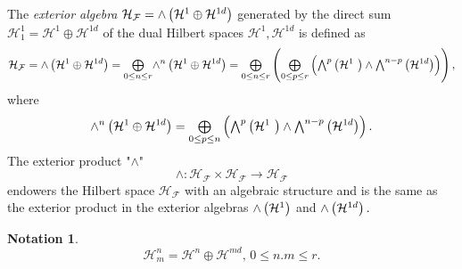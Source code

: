 \documentclass[aps,preprint]{revtex4}%
\newtheorem{notation}[theorem]{Notation}
\begin{document}
The \emph{exterior algebra} $\mathcal{H}_{\mathcal{F}}={\huge \wedge}\left(
\mathcal{H}^{1}\oplus\mathcal{H}^{1d}\right)  $ generated by the direct sum
$\mathcal{H}_{1}^{1}=\mathcal{H}^{1}\oplus\mathcal{H}^{1d}$ of the dual
Hilbert spaces $\mathcal{H}^{1},\mathcal{H}^{1d}$ is defined as
\begin{equation}
\mathcal{H}_{\mathcal{F}}={\huge \wedge}\left(  \mathcal{H}^{1}\oplus
\mathcal{H}^{1d}\right)  =%
{\textstyle\bigoplus\limits_{0\leq n\leq r}}
{\huge \wedge}^{n}\left(  \mathcal{H}^{1}\oplus\mathcal{H}^{1d}\right)  =%
{\textstyle\bigoplus\limits_{0\leq n\leq r}}
\left(
{\textstyle\bigoplus\limits_{0\leq p\leq r}}
\left(
{\textstyle\bigwedge\nolimits^{p}}
\left(  \mathcal{H}^{1}\ \right)  \wedge%
{\textstyle\bigwedge\nolimits^{n-p}}
\left(  \mathcal{H}^{1d}\right)  \right)  \right)  ,
\end{equation}
where
\begin{equation}
{\huge \wedge}^{n}\left(  \mathcal{H}^{1}\oplus\mathcal{H}^{1d}\right)  =%
{\textstyle\bigoplus\limits_{0\leq p\leq n}}
\left(
{\textstyle\bigwedge\nolimits^{p}}
\left(  \mathcal{H}^{1}\ \right)  \wedge%
{\textstyle\bigwedge\nolimits^{n-p}}
\left(  \mathcal{H}^{1d}\right)  \right)  .
\end{equation}
The exterior product "$\wedge$"
\begin{equation}
\wedge:\mathcal{H}_{\mathcal{F}}\times\mathcal{H}_{\mathcal{F}}\rightarrow
\mathcal{H}_{\mathcal{F}}%
\end{equation}
endowers the Hilbert space $\mathcal{H}_{\mathcal{F}}$ with an algebraic
structure and is the same as the exterior product in the exterior algebras
${\huge \wedge}\left(  \mathcal{H}^{1}\right)  $ and ${\huge \wedge}\left(
\mathcal{H}^{1d}\right)  .$

\begin{notation}%
\begin{equation}
\mathcal{H}_{m}^{n}=\mathcal{H}^{n}\oplus\mathcal{H}^{md},\,0\leq n.m\leq r.
\end{equation}

\end{notation}
\end{document}
